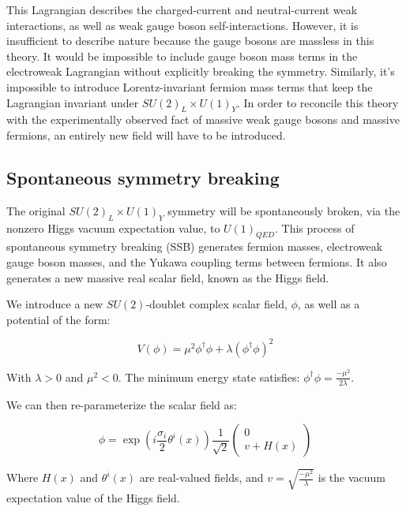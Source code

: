 This Lagrangian describes the charged-current and neutral-current weak interactions, as well as weak gauge boson self-interactions.
However, it is insufficient to describe nature because the gauge bosons are massless in this theory.
It would be impossible to include gauge boson mass terms in the electroweak Lagrangian without explicitly breaking the symmetry.
Similarly, it's impossible to introduce Lorentz-invariant fermion mass terms that keep the Lagrangian invariant under $SU(2)_L \times U(1)_Y$.
In order to reconcile this theory with the experimentally observed fact of massive weak gauge bosons and massive fermions,
an entirely new field will have to be introduced.

\subsection{Spontaneous symmetry breaking}\label{subsec:ew_higgs}

The original $SU(2)_{L}\times U(1)_Y$ symmetry will be spontaneously broken, via the nonzero Higgs vacuum expectation value, to $U(1)_{QED}$.
This process of spontaneous symmetry breaking (SSB) generates fermion masses, electroweak gauge boson masses,
and the Yukawa coupling terms between fermions.
It also generates a new massive real scalar field, known as the Higgs field.

We introduce a new $SU(2)$-doublet complex scalar field, $\phi$, as well as a potential of the form:

\begin{equation}\label{eq:higgs_potential}
    V(\phi) = \mu^2 \phi^\dagger\phi + \lambda(\phi^\dagger\phi)^2
\end{equation}

With $\lambda > 0$ and $\mu^2 <0$.
The minimum energy state satisfies: $\phi^\dagger\phi = \frac{-\mu^2}{2\lambda}$.

We can then re-parameterize the scalar field as:

\begin{equation}\label{eq:higgs_param}
    \phi = \exp{\left(i\frac{\sigma_i}{2}\theta^i(x)\right)}\frac{1}{\sqrt{2}}\begin{pmatrix} 0 \\ v+H(x) \end{pmatrix}
\end{equation}

Where $H(x)$ and $\theta^i(x)$ are real-valued fields,
and $v = \sqrt{\frac{-\mu^2}{\lambda}}$ is the vacuum expectation value of the Higgs field.


